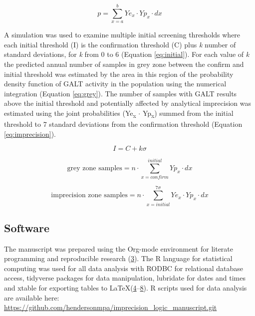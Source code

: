 \documentclass[review]{elsarticle}
\begin{document}
\begin{equation}\label{eq:joint}
p = \sum_{x=a}^b Ye_x \cdot Yp_x \cdot dx
\end{equation}

A simulation was used to examine multiple initial screening thresholds
where each initial threshold (I) is the confirmation threshold (C)
plus \emph{k} number of standard deviations, for \emph{k} from 0 to 6 (Equation
\ref{eq:initial}). For each value of \emph{k} the predicted annual number
of samples in grey zone between the confirm and initial threshold was
estimated by the area in this region of the probability density
function of GALT activity in the population using the numerical
integration (Equation \ref{eq:grey}). The number of samples with GALT
results above the initial threshold and potentially affected by
analytical imprecision was estimated using the joint probabilities
(Ye\textsubscript{x} \(\cdot\) Yp\textsubscript{x}) summed from the initial threshold to 7 standard
deviations from the confirmation threshold (Equation
\ref{eq:imprecision}).

\begin{equation}\label{eq:initial}
I = C + k\sigma 
\end{equation}

\begin{equation}\label{eq:grey}
\text{grey zone samples}  =  n \cdot \sum_{x=confirm}^{initial} Yp_x \cdot dx
\end{equation}

\begin{equation}\label{eq:imprecision}
\text{imprecision zone samples}  =  n \cdot \sum_{x=initial}^{7\sigma} Ye_x \cdot Yp_x \cdot dx
\end{equation}

\subsection*{Software}
\label{sec:orgef09b5b}
The manuscript was prepared using the Org-mode environment for
literate programming and reproducible research (\hyperlink{citeproc_bib_item_3}{3}). The R language for statistical computing was used
for all data analysis with RODBC for relational database access,
tidyverse packages for data manipulation, lubridate for dates and
times and xtable for exporting tables to
\LaTeX (\hyperlink{citeproc_bib_item_4}{4}–\hyperlink{citeproc_bib_item_8}{8}). R scripts
used for data analysis are available here:
\url{https://github.com/hendersonmpa/imprecision\_logic\_manuscript.git}
\end{document}
